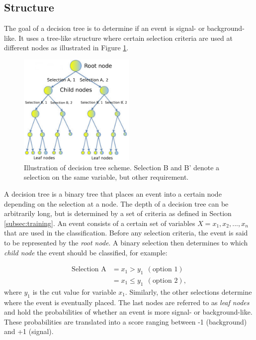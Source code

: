 \subsection{Structure}
The goal of a decision tree is to determine if an event is signal- or background-like. It uses a tree-like structure where certain selection criteria are used at different nodes as illustrated in Figure \ref{fig:bdt}.

\begin{figure}[t]
\centering
\includegraphics[width=0.5\textwidth]{chapter7/img/bdt.png}
\caption{Illustration of decision tree scheme. Selection B and B' denote a selection on the same variable, but other requirement.}
\label{fig:bdt}
\end{figure}
A decision tree is a binary tree that places an event into a certain node depending on the selection at a node. The depth of a decision tree can be arbitrarily long, but is determined by a set of criteria as defined in Section \ref{subsec:training}. An event consists of a certain set of variables $X = {x_1,x_2,...,x_n}$ that are used in the classification. Before any selection criteria, the event is said to be represented by the \textit{root node}. A binary selection then determines to which \textit{child node} the event should be classified, for example: 

\begin{equation}
\begin{split}
\textrm{Selection A} &= x_1 > y_1 \ \ (\textrm{option 1})\\
&= x_1 \leq y_1 \ \ (\textrm{option 2}),
\end{split}
\end{equation}
where $y_1$ is the cut value for variable $x_1$. Similarly, the other selections determine where the event is eventually placed. The last nodes are referred to as \textit{leaf nodes} and hold the probabilities of whether an event is more signal- or background-like. These probabilities are translated into a score ranging between -1 (background) and +1 (signal). 

